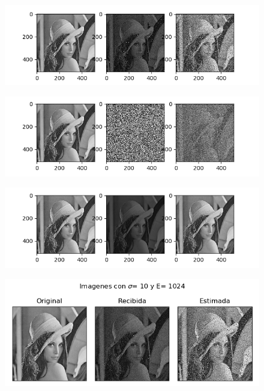 \begin{figure}[H]
	\includegraphics[scale=1]{Imagenes/E32S10}
	\centering
\end{figure}

\begin{figure}[H]
\includegraphics[scale=1]{Imagenes/E32S100}
\centering
\end{figure}

\begin{figure}[H]
\includegraphics[scale=1]{Imagenes/E1024S01}
\centering
\end{figure}

\begin{figure}[H]
\includegraphics[scale=1]{Imagenes/E1024S10}
\centering
\end{figure}

